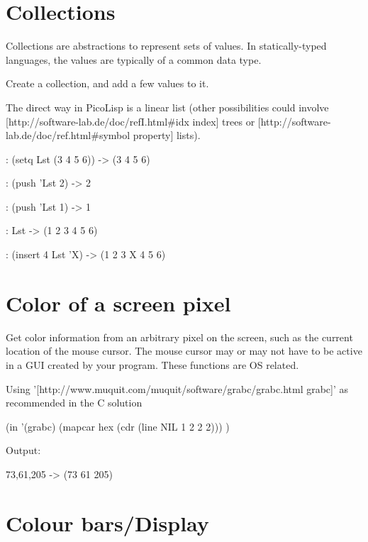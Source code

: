 \pagebreak{}
\section*{Collections}


Collections are abstractions to represent sets of values. In
statically-typed languages, the values are typically of a common data
type.

Create a collection, and add a few values to it.


\begin{wideverbatim}

The direct way in PicoLisp is a linear list (other possibilities could involve
[http://software-lab.de/doc/refI.html#idx index] trees or
[http://software-lab.de/doc/ref.html#symbol property] lists).

: (setq Lst (3 4 5 6))
-> (3 4 5 6)

: (push 'Lst 2)
-> 2

: (push 'Lst 1)
-> 1

: Lst
-> (1 2 3 4 5 6)

: (insert 4 Lst 'X)
-> (1 2 3 X 4 5 6)

\end{wideverbatim}

\pagebreak{}
\section*{Color of a screen pixel}


Get color information from an arbitrary pixel on the screen, such as the
current location of the mouse cursor. The mouse cursor may or may not
have to be active in a GUI created by your program. These functions are
OS related.


\begin{wideverbatim}

Using '[http://www.muquit.com/muquit/software/grabc/grabc.html grabc]'
as recommended in the C solution

(in '(grabc)
   (mapcar hex (cdr (line NIL 1 2 2 2))) )

Output:

73,61,205
-> (73 61 205)

\end{wideverbatim}

\pagebreak{}
\section*{Colour bars/Display}

